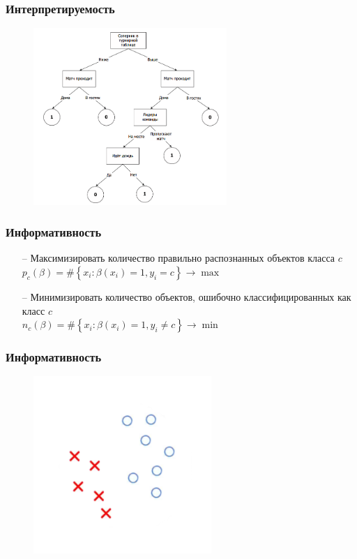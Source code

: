 \documentclass[12pt]{beamer}
\begin{document}
\begin{frame}\frametitle{Интерпретируемость}
\begin{figure}[htbp]
  \includegraphics[height=190pt, keepaspectratio = true]{images/dtree}   
\end{figure}
\end{frame}

\begin{frame}\frametitle{Информативность}
	\begin{itemize}
		\item[--] Максимизировать количество правильно распознанных объектов класса $c$\\
		${ p_c(\beta) = \# \left\{ x_i: \beta(x_i) = 1 , y_i = c \right\} \rightarrow \max }$\\

		\item[--] Минимизировать количество объектов, ошибочно классифицированных как класс $c$\\
		${ n_c(\beta) = \# \left\{ x_i: \beta(x_i) = 1 , y_i \neq c \right\} \rightarrow \min }$\\
		
	\end{itemize}
\end{frame}

\begin{frame}\frametitle{Информативность}
\begin{figure}[htbp]
  \includegraphics[height=190pt, keepaspectratio = true]{images/dtree_1}   
\end{figure}
\end{frame}
\end{document}
